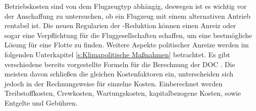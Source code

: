 Betriebskosten sind von dem Flugzeugtyp abhängig, deswegen ist es wichtig vor der Anschaffung zu untersuchen, 
ob ein Flugzeug mit einem alternativen Antrieb rentabel ist. 
Die neuen Regularien der -Reduktion können einen Anreiz oder sogar 
eine Verpflichtung für die Fluggesellschaften schaffen, um eine bestmögliche Lösung für eine Flotte zu finden. 
Weitere Aspekte politischer Anreize werden im folgenden Unterkapitel \ref{s:Klimapolitische Maßnahmen} betrachtet.
%
Es gibt verschiedene bereits vorgestellte Formeln für die Berechnung der DOC \cite{scholz_design_evaluation_doc}. 
Die meisten davon schließen die gleichen Kostenfaktoren ein, 
unterscheiden sich jedoch in der Rechnungsweise für einzelne Kosten.
Einberechnet werden Treibstoffkosten, Crewkosten, Wartungskosten, kapitalbezogene Kosten, sowie Entgelte und Gebühren.\\

